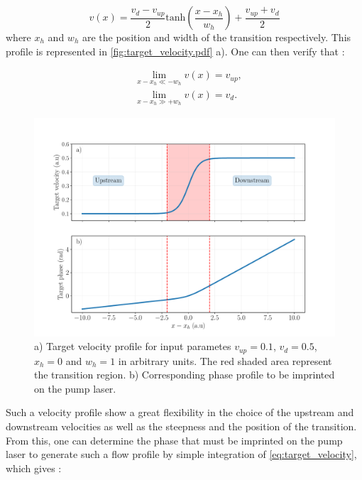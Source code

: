 \begin{equation}
    v(x)= \frac{v_{d}-v_{up}}{2}\mathrm{tanh}(\frac{x-x_h}{w_h})+\frac{v_{up}+v_{d}}{2}
    \label{eq:target_velocity}
\end{equation}
where $x_h$ and $w_h$ are the position and width of the transition respectively. This profile is represented in \autoref{fig:target_velocity.pdf} a).
One can then verify that :

\begin{subequations}
    \begin{align}
    &\lim\limits_{x-x_h\ll-w_h} v(x) = v_{up},\\
    &\lim\limits_{x-x_h\gg+w_h} v(x) = v_{d}.
    \end{align}
\end{subequations}

\begin{figure}[h]
    \centering
    \includegraphics[width=1\textwidth]{chap3_custom_st/fig/target_velocity.pdf}
    \caption{ a) Target velocity profile for input parametes $v_{up}=0.1$, $v_{d}=0.5$, $x_h=0$ and $w_h=1$ in arbitrary units. The red shaded area represent the 
    transition region. b) Corresponding phase profile to be imprinted on the pump laser.}
    \label{fig:target_velocity.pdf}
\end{figure}

Such a velocity profile show a great flexibility in the choice of the upstream and downstream velocities as well as the steepness and the position of the transition. From 
this, one can determine the phase that must be imprinted on the pump laser to generate such a flow profile by simple integration of \autoref{eq:target_velocity}, which gives :

